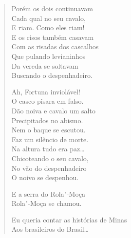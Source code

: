 {\begin{verse}
\quad\quad\quad{}Porém os dois continuavam\\
\quad\quad\quad{}Cada qual no seu cavalo,\\
\quad\quad\quad{}E riam. Como eles riam!\\
\quad\quad\quad{}E os risos também casavam\\
\quad\quad\quad{}Com as risadas dos cascalhos\\
\quad\quad\quad{}Que pulando levianinhos\\
\quad\quad\quad{}Da vereda se soltavam\\
\quad\quad\quad{}Buscando o despenhadeiro.

\quad\quad\quad{}Ah, Fortuna inviolável!\\
\quad\quad\quad{}O casco pisara em falso.\\
\quad\quad\quad{}Dão noiva e cavalo um salto\\
\quad\quad\quad{}Precipitados no abismo.\\
\quad\quad\quad{}Nem o baque se escutou.\\
\quad\quad\quad{}Faz um silêncio de morte.\\
\quad\quad\quad{}Na altura tudo era paz\ldots{}\\
\quad\quad\quad{}Chicoteando o seu cavalo,\\
\quad\quad\quad{}No vão do despenhadeiro\\
\quad\quad\quad{}O noivo se despenhou.

\quad\quad\quad{}E a serra do Rola"-Moça\\
\quad\quad\quad{}Rola"-Moça se chamou.

Eu queria contar as histórias de Minas\\
Aos brasileiros do Brasil\ldots{}


\end{verse}}
